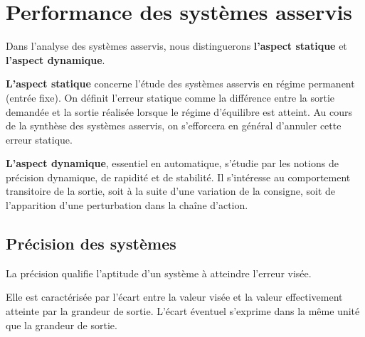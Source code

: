 \documentclass[11pt,oneside]{article}
\begin{document}
\section{Performance des systèmes asservis}
Dans l'analyse des systèmes asservis, nous distinguerons \textbf{l'aspect
statique} et \textbf{l'aspect dynamique}. 

\textbf{L'aspect statique} concerne l'étude des systèmes asservis en régime
permanent (entrée fixe). On définit l'erreur statique comme la différence entre
la sortie demandée et la sortie réalisée lorsque le régime d'équilibre est
atteint. Au cours de la synthèse des systèmes asservis, on s'efforcera en
général d'annuler cette erreur statique. 

\textbf{L'aspect dynamique}, essentiel en automatique, s'étudie par les notions
de précision dynamique, de rapidité et de stabilité. Il s'intéresse au
comportement transitoire de la sortie, soit à la suite d'une variation de la
consigne, soit de l'apparition d'une perturbation dans la chaîne d'action. 

\subsection{Précision des systèmes}
La précision qualifie l'aptitude d'un système à atteindre l'erreur visée. 

Elle est caractérisée par l'écart entre la valeur visée et la valeur
effectivement atteinte par la grandeur de sortie. L'écart éventuel s'exprime
dans la même unité que la grandeur de sortie. 
\end{document}
